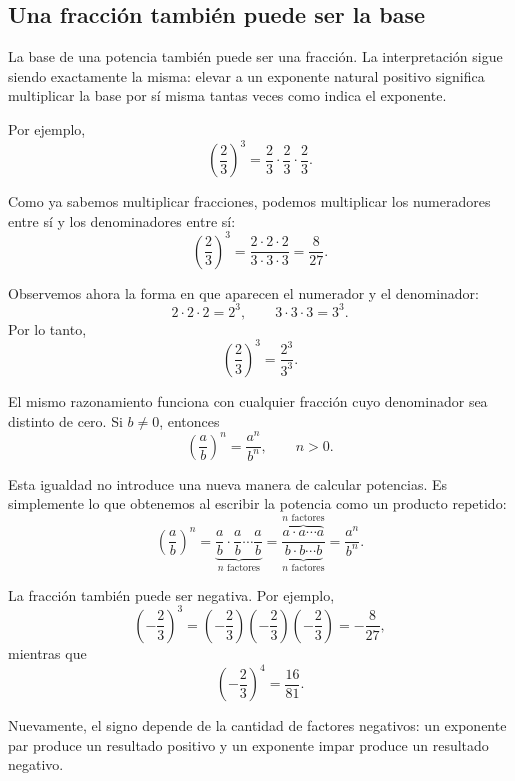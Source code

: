 \subsection{Una fracción también puede ser la base}

La base de una potencia también puede ser una fracción. La interpretación sigue siendo exactamente la misma: elevar a un exponente natural positivo significa multiplicar la base por sí misma tantas veces como indica el exponente.

Por ejemplo,
\[
\left(\frac{2}{3}\right)^3
=
\frac{2}{3}\cdot
\frac{2}{3}\cdot
\frac{2}{3}.
\]

Como ya sabemos multiplicar fracciones, podemos multiplicar los numeradores entre sí y los denominadores entre sí:
\[
\left(\frac{2}{3}\right)^3
=
\frac{2\cdot2\cdot2}{3\cdot3\cdot3}
=
\frac{8}{27}.
\]

Observemos ahora la forma en que aparecen el numerador y el denominador:
\[
2\cdot2\cdot2=2^3,
\qquad
3\cdot3\cdot3=3^3.
\]
Por lo tanto,
\[
\left(\frac{2}{3}\right)^3
=
\frac{2^3}{3^3}.
\]

El mismo razonamiento funciona con cualquier fracción cuyo denominador sea distinto de cero. Si \(b\ne0\), entonces
\[
\left(\frac{a}{b}\right)^n
=
\frac{a^n}{b^n},
\qquad n>0.
\]

Esta igualdad no introduce una nueva manera de calcular potencias. Es simplemente lo que obtenemos al escribir la potencia como un producto repetido:
\[
\left(\frac{a}{b}\right)^n
=
\underbrace{
\frac{a}{b}\cdot
\frac{a}{b}\cdots
\frac{a}{b}
}_{n\text{ factores}}
=
\frac{
  \overbrace{a\cdot a\cdots a}^{n\text{ factores}}
}{
\underbrace{b\cdot b\cdots b}_{n\text{ factores}}
}
=
\frac{a^n}{b^n}.
\]

La fracción también puede ser negativa. Por ejemplo,
\[
\left(-\frac{2}{3}\right)^3
=
\left(-\frac{2}{3}\right)
\left(-\frac{2}{3}\right)
\left(-\frac{2}{3}\right)
=
-\frac{8}{27},
\]
mientras que
\[
\left(-\frac{2}{3}\right)^4
=
\frac{16}{81}.
\]

Nuevamente, el signo depende de la cantidad de factores negativos: un exponente par produce un resultado positivo y un exponente impar produce un resultado negativo.
